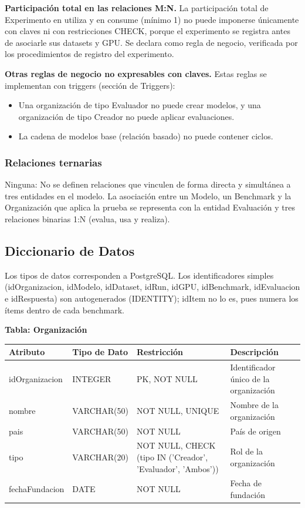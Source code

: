 \documentclass[12pt,a4paper]{article}
\begin{document}
\textbf{Participación total en las relaciones M:N.} La participación total de Experimento en utiliza y en consume (mínimo 1) no puede imponerse únicamente con claves ni con restricciones CHECK, porque el experimento se registra antes de asociarle sus datasets y GPU. Se declara como regla de negocio, verificada por los procedimientos de registro del experimento.

\textbf{Otras reglas de negocio no expresables con claves.} Estas reglas se implementan con triggers (sección de Triggers):
{\begin{itemize}
  \item Una organización de tipo Evaluador no puede crear modelos, y una organización de tipo Creador no puede aplicar evaluaciones.
  \item La cadena de modelos base (relación basado) no puede contener ciclos.
\end{itemize}
}

\subsubsection{Relaciones ternarias}

Ninguna: No se definen relaciones que vinculen de forma directa y simultánea a tres entidades en el modelo. La asociación entre un Modelo, un Benchmark y la Organización que aplica la prueba se representa con la entidad Evaluación y tres relaciones binarias 1:N (evalua, usa y realiza).

\subsection{Diccionario de Datos}

Los tipos de datos corresponden a PostgreSQL. Los identificadores simples (idOrganizacion, idModelo, idDataset, idRun, idGPU, idBenchmark, idEvaluacion e idRespuesta) son autogenerados (IDENTITY); idItem no lo es, pues numera los ítems dentro de cada benchmark.

\textbf{Tabla: Organización}

\begin{longtable}{|>{\raggedright\arraybackslash}p{3.45cm}|>{\raggedright\arraybackslash}p{3.45cm}|>{\raggedright\arraybackslash}p{3.45cm}|>{\raggedright\arraybackslash}p{3.45cm}|}
\hline
\textbf{Atributo} & \textbf{Tipo de Dato} & \textbf{Restricción} & \textbf{Descripción} \\
\hline
idOrganizacion & INTEGER & PK, NOT NULL & Identificador único de la organización \\
\hline
nombre & VARCHAR(50) & NOT NULL, UNIQUE & Nombre de la organización \\
\hline
pais & VARCHAR(50) & NOT NULL & País de origen \\
\hline
tipo & VARCHAR(20) & NOT NULL, CHECK (tipo IN ('Creador', 'Evaluador', 'Ambos')) & Rol de la organización \\
\hline
fechaFundacion & DATE & NOT NULL & Fecha de fundación \\
\hline
\end{longtable}
\end{document}
